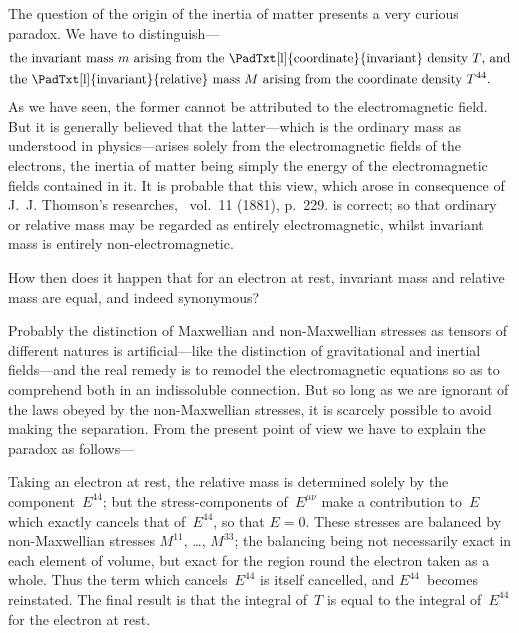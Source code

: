 \documentclass[12pt]{book}
\begin{document}
The question of the origin of the inertia of matter presents a very curious
%
paradox. We have to distinguish---
\begin{align*}
  &\text{the invariant mass~$m$ arising from the \PadTxt[l]{coordinate}{invariant} density~$T$, and} \\
\index{Invariant mass}%
  &\text{the \PadTxt[l]{invariant}{relative} mass~$M$ arising from the coordinate density~$T^{44}$.}
\end{align*}
As we have seen, the former cannot be attributed to the electromagnetic field.
But it is generally believed that the latter---which is the ordinary mass as
understood in physics---arises solely from the electromagnetic fields of the
electrons, the inertia of matter being simply the energy of the electromagnetic
fields contained in it. It is probable that this view, which arose in consequence
of J.~J. Thomson's researches\footnotemark,\footnotetext
  {\ vol.~11 (1881), p.~229.}
is correct; so that ordinary or relative mass
may be regarded as entirely electromagnetic, whilst invariant mass is entirely
non\hyp{}electromagnetic.

How then does it happen that for an electron at rest, invariant mass and
relative mass are equal, and indeed synonymous?

Probably the distinction of Maxwellian and non\hyp{}Maxwellian stresses as
%
%
tensors of different natures is artificial---like the distinction of gravitational
and inertial fields---and the real remedy is to remodel the electromagnetic
equations so as to comprehend both in an indissoluble connection. But so
long as we are ignorant of the laws obeyed by the non\hyp{}Maxwellian stresses, it
is scarcely possible to avoid making the separation. From the present point
of view we have to explain the paradox as follows---

Taking an electron at rest, the relative mass is determined solely by the
component~$E^{44}$; but the stress\hyp{}components of~$E^{\mu\nu}$ make a contribution to~$E$
which exactly cancels that of~$E^{44}$, so that $E = 0$. These stresses are balanced
by non\hyp{}Maxwellian stresses $M^{11}$, \dots, $M^{33}$; the balancing being not necessarily
exact in each element of volume, but exact for the region round the electron
taken as a whole. Thus the term which cancels~$E^{44}$ is itself cancelled, and $E^{44}$~becomes
reinstated. The final result is that the integral of~$T$ is equal to the
integral of~$E^{44}$ for the electron at rest.
\end{document}
